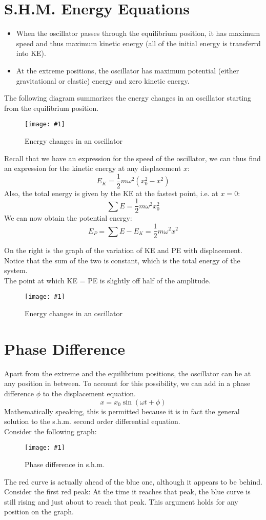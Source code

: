 \documentclass[a4paper,12pt]{article}
\let\oldsection\section
\renewcommand\section{\clearpage\oldsection}
\newcommand{\lb}{\\[8pt]}
\newcommand{\img}[4]{\begin{center}
  \begin{figure}[H]
    \centering
    \texttt{[image: \#1]}
    \caption{#3}
    \label{fig:#4}
  \end{figure}
\end{center}}
\newcommand{\paren}[1]{\left(#1\right)}
\begin{document}
\section{S.H.M. Energy Equations}

\begin{itemize}
  \item When the oscillator passes through the equilibrium position, it has maximum speed and thus maximum kinetic energy (all of the initial energy is transferrd into KE).
  \item At the extreme positions, the oscillator has maximum potential (either gravitational or elastic) energy and zero kinetic energy.
\end{itemize}

The following diagram summarizes the energy changes in an oscillator starting from the equilibrium position.
\img{energy1.png}{0.7}{Energy changes in an oscillator}{energy}
Recall that we have an expression for the speed of the oscillator, we can thus find an expression for the kinetic energy at any displacement $x$:
\begin{equation}
  E_K = \frac{1}{2}m\omega^2\paren{x_0^2 - x^2}
\end{equation}
Also, the total energy is given by the KE at the fastest point, i.e. at $x = 0$:
\begin{equation}
  \sum E = \frac{1}{2}m\omega^2x_0^2
\end{equation}
We can now obtain the potential energy:
\begin{equation}
  E_P = \sum E - E_K = \frac{1}{2}m\omega^2x^2
\end{equation}

\begin{minipage}[t]{0.5\textwidth}
  On the right is the graph of the variation of KE and PE with displacement. Notice that the sum of the two is constant, which is the total energy of the system.\lb
  The point at which KE = PE is slightly off half of the amplitude.
\end{minipage}\hspace*{0.1\textwidth}%
\begin{minipage}[t]{0.4\textwidth}
  \img{rel.png}{1}{Energy changes in an oscillator}{rel}
\end{minipage}


\section{Phase Difference}

Apart from the extreme and the equilibrium positions, the oscillator can be at any position in between. To account for this possibility, we can add in a phase difference $\phi$ to the displacement equation.
$$x = x_0\sin(\omega t + \phi)$$
Mathematically speaking, this is permitted because it is in fact the general solution to the s.h.m. second order differential equation.\lb
Consider the following graph:
\img{shmphase.png}{0.6}{Phase difference in s.h.m.}{shmphase}
The red curve is actually ahead of the blue one, although it appears to be behind. Consider the first red peak: At the time it reaches that peak, the blue curve is still rising and just about to reach that peak. This argument holds for any position on the graph.
\end{document}

